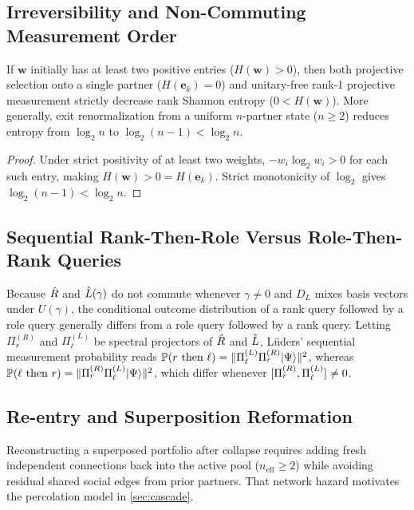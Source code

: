 \subsection{Irreversibility and Non-Commuting Measurement Order}
\label{subsec:poke-irreversibility}

\begin{proposition}
\label{prop:irreversibility}
If $\mathbf{w}$ initially has at least two positive entries ($H(\mathbf{w}) > 0$), then
both projective selection onto a single partner ($H(\mathbf{e}_k) = 0$) and unitary-free
rank-1 projective measurement strictly decrease rank Shannon entropy ($0 < H(\mathbf{w})$).
More generally, exit renormalization from a uniform $n$-partner state ($n \ge 2$) reduces
entropy from $\log_2 n$ to $\log_2(n - 1) < \log_2 n$.
\end{proposition}
\begin{proof}
Under strict positivity of at least two weights, $-w_i \log_2 w_i > 0$ for each such entry,
making $H(\mathbf{w}) > 0 = H(\mathbf{e}_k)$. Strict monotonicity of $\log_2$ gives
$\log_2(n-1) < \log_2 n$.
\end{proof}

\subsection{Sequential Rank-Then-Role Versus Role-Then-Rank Queries}
\label{subsec:poke-sequential}

\noindent\layermath{} \layerformal{} Because $\hat{R}$ and $\hat{L}(\gamma)$ do not commute
whenever $\gamma \neq 0$ and $D_L$ mixes basis vectors under $U(\gamma)$, the conditional
outcome distribution of a rank query followed by a role query generally differs from
a role query followed by a rank query. Letting $\Pi_r^{(R)}$ and $\Pi_\ell^{(L)}$ be
spectral projectors of $\hat{R}$ and $\hat{L}$, L\"uders' sequential measurement probability reads
$\mathbb{P}(r \text{ then } \ell) = \lVert \Pi_\ell^{(L)} \Pi_r^{(R)} \lvert \Psi \rangle \rVert^2$, whereas
$\mathbb{P}(\ell \text{ then } r) = \lVert \Pi_r^{(R)} \Pi_\ell^{(L)} \lvert \Psi \rangle \rVert^2$, which differ
whenever $[\Pi_r^{(R)}, \Pi_\ell^{(L)}] \neq 0$.

\subsection{Re-entry and Superposition Reformation}
\label{subsec:poke-reentry}

\noindent\layerbehav{} Reconstructing a superposed portfolio after collapse requires
adding fresh independent connections back into the active pool ($n_{\mathrm{eff}} \ge 2$)
while avoiding residual shared social edges from prior partners. That network hazard
motivates the percolation model in \cref{sec:cascade}.
